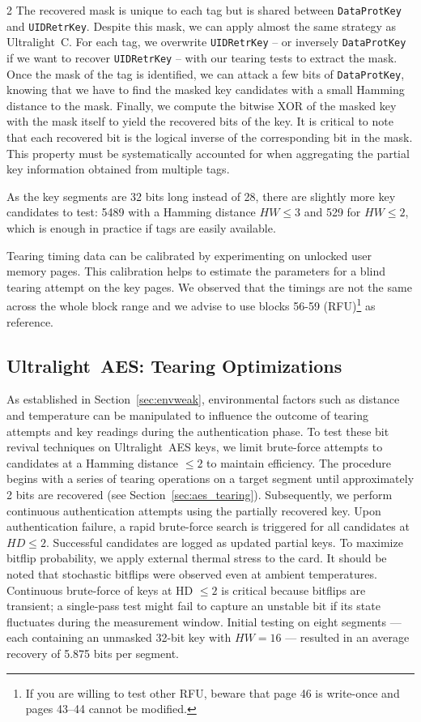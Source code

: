 \documentclass[10pt,letterpaper]{article}
\begin{document}
\begin{multicols}{2}
The recovered mask is unique to each tag but is shared between \texttt{DataProtKey} and \texttt{UIDRetrKey}.
Despite this mask, we can apply almost the same strategy as Ultralight~C. For each tag, we overwrite \texttt{UIDRetrKey} -- or inversely \texttt{DataProtKey} if we want to recover \texttt{UIDRetrKey} -- with our tearing tests to extract the mask. Once the mask of the tag is identified, we can attack a few bits of \texttt{DataProtKey}, knowing that we have to find the masked key candidates with a small Hamming distance to the mask. Finally, we compute the bitwise XOR of the masked key with the mask itself to yield the recovered bits of the key. It is critical to note that each recovered bit is the logical inverse of the corresponding bit in the mask. This property must be systematically accounted for when aggregating the partial key information obtained from multiple tags.

As the key segments are 32 bits long instead of 28, there are slightly more key candidates to test: 5489 with a Hamming distance $HW\leq 3$ and 529 for $HW\leq 2$, which is enough in practice if tags are easily available.

Tearing timing data can be calibrated by experimenting on unlocked user memory pages. This calibration helps to estimate the parameters for a blind tearing attempt on the key pages. We observed that the timings are not the same across the whole block range and we advise to use blocks 56-59 (RFU)\footnote{If you are willing to test other RFU, beware that page 46 is write-once and pages 43--44 cannot be modified.} as reference.

\subsection{Ultralight~AES: Tearing Optimizations}
\label{sec:aes_tearing2}

As established in Section~\ref{sec:envweak}, environmental factors such as distance and temperature can be manipulated to influence the outcome of tearing attempts and key readings during the authentication phase.
To test these bit revival techniques on Ultralight~AES keys, we limit brute-force attempts to candidates at a Hamming distance $\leq 2$ to maintain efficiency.
The procedure begins with a series of tearing operations on a target segment until approximately 2 bits are recovered (see Section~\ref{sec:aes_tearing}).
Subsequently, we perform continuous authentication attempts using the partially recovered key. Upon authentication failure, a rapid brute-force search is triggered for all candidates at $HD \leq 2$. Successful candidates are logged as updated partial keys. To maximize bitflip probability, we apply external thermal stress to the card. It should be noted that stochastic bitflips were observed even at ambient temperatures.
Continuous brute-force of keys at HD $\leq 2$ is critical because bitflips are transient; a single-pass test might fail to capture an unstable bit if its state fluctuates during the measurement window.
Initial testing on eight segments --- each containing an unmasked 32-bit key with $HW=16$ --- resulted in an average recovery of 5.875 bits per segment.


\end{multicols}
\end{document}
